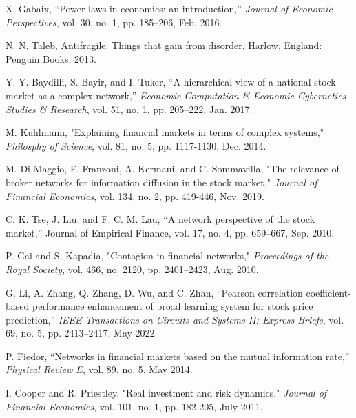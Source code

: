 \documentclass[letterpaper, 11 pt, proceedings]{IEEEtran}
\begin{document}
	
	\begin{thebibliography}{99}	
		X. Gabaix, “Power laws in economics: an introduction,” \textit{Journal of Economic Perspectives}, vol. 30, no. 1, pp. 185–206, Feb. 2016.
		
		N. N. Taleb, Antifragile: Things that gain from disorder. Harlow, England: Penguin Books, 2013.
		
		Y. Y. Baydilli, S. Bayir, and I. Tuker, “A hierarchical view of a national stock market as a complex network,” \textit{Economic Computation \& Economic Cybernetics Studies \& Research}, vol. 51, no. 1, pp. 205–222, Jan. 2017.

		M. Kuhlmann, "Explaining financial markets in terms of complex systems," \textit{Philosphy of Science}, vol. 81, no. 5, pp. 1117-1130, Dec. 2014. %
		
		M. Di Maggio, F. Franzoni, A. Kermani, and C. Sommavilla, "The relevance of broker networks for information diffusion in the stock market," \textit{Journal of Financial Economics}, vol. 134, no. 2, pp. 419-446, Nov. 2019. %

		C. K. Tse, J. Liu, and F. C. M. Lau, “A network perspective of the stock market,” Journal of Empirical Finance, vol. 17, no. 4, pp. 659–667, Sep. 2010.

		P. Gai and S. Kapadia, "Contagion in financial networks," \textit{Proceedings of the Royal Society}, vol. 466, no. 2120, pp. 2401–2423, Aug. 2010.

		G. Li, A. Zhang, Q. Zhang, D. Wu, and C. Zhan, “Pearson correlation coefficient-based performance enhancement of broad learning system for stock price prediction,” \textit{IEEE Transactions on Circuits and Systems II: Express Briefs}, vol. 69, no. 5, pp. 2413–2417, May 2022. %
		
		P. Fiedor, “Networks in financial markets based on the mutual information rate,” \textit{Physical Review E}, vol. 89, no. 5, May 2014. %
		
		I. Cooper and R. Priestley. "Real investment and risk dynamics," \textit{Journal of Financial Economics}, vol. 101, no. 1, pp. 182-205, July 2011.
		

\end{thebibliography}
\end{document}
